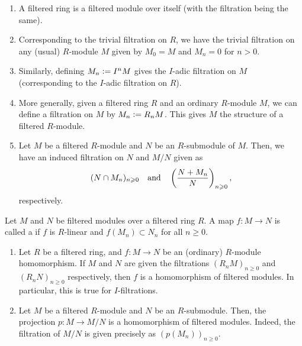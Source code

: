 \begin{enumerate}
	\item A filtered ring is a filtered module over itself (with the filtration being the same).
	\item Corresponding to the trivial filtration on $R$, we have the trivial filtration on any (usual) $R$-module $M$ given by $M_{0} = M$ and $M_{n} = 0$ for $n > 0$.
	\item Similarly, defining $M_{n} \vcentcolon= I^{n} M$ gives the $I$-adic filtration on $M$ (corresponding to the $I$-adic filtration on $R$).
	\item More generally, given a filtered ring $R$ and an ordinary $R$-module $M$, we can define a filtration on $M$ by $M_{n} \vcentcolon= R_{n} M$. This gives $M$ the structure of a filtered $R$-module.
	\item Let $M$ be a filtered $R$-module and $N$ be an $R$-submodule of $M$. Then, we have an induced filtration on $N$ and $M/N$ given as
	\begin{equation*} 
		(N \cap M_{n})_{n \geqslant 0} \quad\text{and}\quad \left(\frac{N + M_{n}}{N}\right)_{n \geqslant 0},
	\end{equation*}
	respectively.
\end{enumerate}

\begin{defn}
	Let $M$ and $N$ be filtered modules over a filtered ring $R$. A map $f : M \to N$ is called a  if $f$ is $R$-linear and $f(M_{n}) \subset N_{n}$ for all $n \ge 0$.
\end{defn}

\begin{ex} \label{ex:homomorphism-filtered-homomorphism}
	\begin{enumerate}
		\item Let $R$ be a filtered ring, and $f : M \to N$ be an (ordinary) $R$-module homomorphism. If $M$ and $N$ are given the filtrations $(R_{n} M)_{n \ge 0}$ and $(R_{n} N)_{n \ge 0}$ respectively, then $f$ is a homomorphism of filtered modules. \newline
		In particular, this is true for $I$-filtrations.
		\item Let $M$ be a filtered $R$-module and $N$ be an $R$-submodule. Then, the projection $p : M \to M/N$ is a homomorphism of filtered modules. Indeed, the filtration of $M/N$ is given precisely as $(p(M_{n}))_{n \ge 0}$.
	\end{enumerate}
\end{ex}

